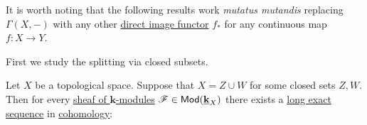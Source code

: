 \documentclass[../../main]{subfiles}
\begin{document}
It is worth noting that the following results work \textit{mutatus mutandis} replacing \(\Gamma(X, -)\) with any other \hyperref[def:direct-image-sheaf]{direct image functor} \(f_{\ast}\) for any continuous map \(f\colon X \to Y\).

First we study the splitting via closed subsets.
\begin{theorem}\label{thm:mayer-vietoris-closed}
  Let \(X\) be a topological space.
  Suppose that \(X = Z \cup W\) for some closed sets \(Z, W\).
  Then for every \hyperref[def:sheaf]{sheaf of \(\mathbf{k}\)-modules} \(\mathscr{F} \in \mathsf{Mod}(\underline{\mathbf{k}}_{X})\) there exists a \hyperref[def:exact-sequence]{long exact sequence} in \hyperref[def:cohomology]{cohomology}:
  \begin{center}
  \end{center}
\end{theorem}
\end{document}
